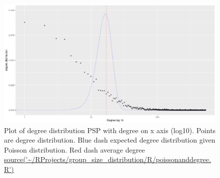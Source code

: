 \begin{figure}
    \centering
    \includegraphics[width=\textwidth]{images/Rplot_poisson_plotted_on_degreedistribution.png}
    \caption{Plot of degree distribution PSP with degree on x axis (log10). Points are degree distribution. Blue dash expected degree distribution given Poisson distribution. Red dash average degree \url{source('~/RProjects/group_size_distribution/R/poissonanddegree.R')}}
    \label{fig:PSP degree powerlaw poisson}
\end{figure}




